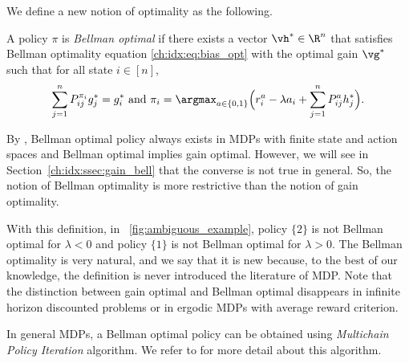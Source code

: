 


We define a new notion of optimality as the following.
\begin{defn}
    \label{ch:idx:defn:bell}
    A policy $\pi$ is \emph{Bellman optimal} if there exists a vector $\vh^*\in\R^n$ that satisfies Bellman optimality equation \eqref{ch:idx:eq:bias_opt} with the optimal gain $\vg^*$ such that for all state $i\in[n]$,
    \begin{equation}
        \label{ch:idx:eq:bell}
        \sum_{j=1}^nP^{\pi_i}_{ij}g^*_j =g^*_i \text{ and } \pi_i=\argmax_{a\in\{0,1\}} \Big(r^{a}_i - \lambda a_i + \sum_{j=1}^n P^{a}_{ij}h^*_j\Big).
    \end{equation}
\end{defn}
By \cite[Theorem~9.1.7]{puterman2014markov}, Bellman optimal policy always exists in MDPs with finite state and action spaces and Bellman optimal implies gain optimal.
However, we will see in Section~\ref{ch:idx:ssec:gain_bell} that the converse is not true in general.
So, the notion of Bellman optimality is more restrictive than the notion of gain optimality.

With this definition, in \figurename~\ref{fig:ambiguous_example}, policy $\{2\}$ is not Bellman optimal for $\lambda<0$ and policy $\{1\}$ is not Bellman optimal for $\lambda>0$.
The Bellman optimality is very natural, and we say that it is new because, to the best of our knowledge, the definition is never introduced the literature of MDP.
Note that the distinction between gain optimal and Bellman optimal disappears in infinite horizon discounted problems or in ergodic MDPs with average reward criterion.

In general MDPs, a Bellman optimal policy can be obtained using \emph{Multichain Policy Iteration} algorithm.
We refer to \cite[Section~9.2.1]{puterman2014markov} for more detail about this algorithm.

